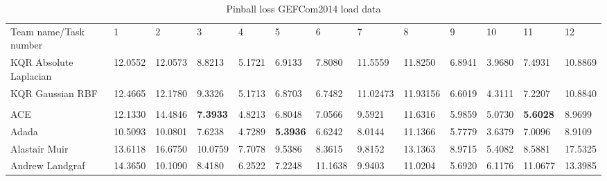 \begin{table}[!ht]
    \caption{Pinball loss GEFCom2014 load data}
    \label{tab:pinball loss gefcom2014 load data}
    \begin{adjustbox}{width=\textwidth}
    \begin{tabular}{lllllllllllll}
      \toprule
      \midrule
      Team name/Task number                       & 1                               & 2                                  & 3                               & 4                              & 5                              & 6       & 7                               & 8       & 9       & 10                             & 11                             & 12                              \\
  
  KQR Absolute Laplacian
  & 
  12.0552
  &
  12.0573
  &
  8.8213
  &
  5.1721
  &
  6.9133
  &
  7.8080
  &
  11.5559
  &
  11.8250
  &
  6.8941
  &
  3.9680
  &
  7.4931
  &
  10.8869
  \\
  KQR Gaussian RBF
  & 
  12.4665
  &
  12.1780
  &
  9.3326
  &
  5.1713
  &
  6.8703
  &
  6.7482
  &
  11.02473
  &
  11.93156
  &
  6.6019
  &
  4.3111
  &
  7.2207
  &
  10.8840
  \\
  \\
  ACE                        & 12.1330                         & 14.4846                         & \textbf{7.3933}                          & 4.8213                         & 6.8048                         & 7.0566  & 9.5921                          & 11.6316 & 5.9859  & 5.0730 & \textbf{5.6028}                         & 8.9699                          \\
  Adada                      & 10.5093                         & 10.0801                         & 7.6238                          & 4.7289                         & \textbf{5.3936}                         & 6.6242  & 8.0144                          & 11.1366 & 5.7779  & 3.6379                         & 7.0096                         & 8.9109                          \\
  Alastair Muir              & 13.6118                         & 16.6750                         & 10.0759                         & 7.7078 & 9.5386 & 8.3615  & 9.8152                          & 13.1363 & 8.9715  & 5.4082                         & 8.5881 & 17.5325                         \\
  Andrew Landgraf            & 14.3650                         & 10.1090                         & 8.4180                          & 6.2522                         & 7.2248                         & 11.1638 & 9.9403                          & 11.0204 & 5.6920  & 6.1176                         & 11.0677                        & 13.3985                         \\

\end{tabular}
\end{adjustbox}
\end{table}
